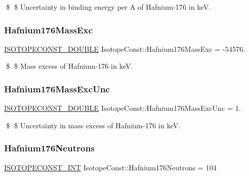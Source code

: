 \$ \$ Uncertainty in binding energy per A of Hafnium-\/176 in keV. \mbox{\label{group___isotope_const-_hafnium-_hf176_gaaf207c59d8cddd64953c6b547f0f543d}} 
\subsubsection{\texorpdfstring{Hafnium176\+Mass\+Exc}{Hafnium176MassExc}}
{\footnotesize\ttfamily \mbox{\hyperlink{group___isotope_const-_macros_ga8f45a7272ce02c0b4c65c44636ed719a}{I\+S\+O\+T\+O\+P\+E\+C\+O\+N\+S\+T\+\_\+\+D\+O\+U\+B\+LE}} Isotope\+Const\+::\+Hafnium176\+Mass\+Exc = -\/54576.}

\$ \$ Mass excess of Hafnium-\/176 in keV. \mbox{\label{group___isotope_const-_hafnium-_hf176_gaf2ba5d8186c14fb75c4fb059c492c39a}} 
\subsubsection{\texorpdfstring{Hafnium176\+Mass\+Exc\+Unc}{Hafnium176MassExcUnc}}
{\footnotesize\ttfamily \mbox{\hyperlink{group___isotope_const-_macros_ga8f45a7272ce02c0b4c65c44636ed719a}{I\+S\+O\+T\+O\+P\+E\+C\+O\+N\+S\+T\+\_\+\+D\+O\+U\+B\+LE}} Isotope\+Const\+::\+Hafnium176\+Mass\+Exc\+Unc = 1.}

\$ \$ Uncertainty in mass excess of Hafnium-\/176 in keV. \mbox{\label{group___isotope_const-_hafnium-_hf176_gae6c32e815a0a15f8685e1784ddf0b851}} 
\subsubsection{\texorpdfstring{Hafnium176\+Neutrons}{Hafnium176Neutrons}}
{\footnotesize\ttfamily \mbox{\hyperlink{group___isotope_const-_macros_ga5f18360b3e99483a35c32d789e62621c}{I\+S\+O\+T\+O\+P\+E\+C\+O\+N\+S\+T\+\_\+\+I\+NT}} Isotope\+Const\+::\+Hafnium176\+Neutrons = 104}

